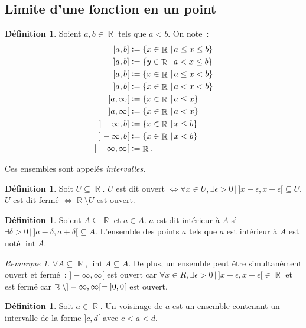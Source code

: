 \documentclass{article}
\DeclareMathOperator{\intr}{int}
\DeclareMathOperator{\R}{\mathbb R}
\theoremstyle{definition}
\newtheorem{déf}[thm]{Définition}
\theoremstyle{remark}
\newtheorem*{rmq}{Remarque}
\begin{document}
	\subsection{Limite d'une fonction en un point}
			\begin{déf} Soient $a, b \in \R$ tels que $a < b$. On note~:
				\[\begin{aligned}
					\interval {a}{b} &:= \{x \in \R \, | \, a \leq x \leq b\} \\
					]a, b] &:= \{y \in \R \, | \, a < x \leq b\} \\
					[a, b[ &:= \{x \in \R \, | \, a \leq x < b\} \\
					]a, b[ &:= \{x \in \R \, | \, a < x < b\} \\
					[a, \infty[ &:= \{x \in \R \, | \, a \leq x\} \\
					]a, \infty[ &:= \{x \in \R \, | \, a < x\} \\
					]-\infty, b] &:= \{x \in \R \, | \, x \leq b\} \\
					]-\infty, b[ &:= \{x \in \R \, | \, x < b\} \\
					]-\infty, \infty[ &:= \R.
				\end{aligned}\]

				Ces ensembles sont appelés \textit{intervalles}. \end{déf}

			\begin{déf} Soit $U \subseteq \R$. $U$ est dit ouvert $\iff \forall x \in U, \exists \epsilon > 0 \, | \, ]x-\epsilon, x+\epsilon[ \subseteq U$.
			$U$ est dit fermé $\iff \R \setminus U$ est ouvert. \end{déf}

			\begin{déf} Soient $A \subseteq \R$ et $a \in A$. $a$ est dit intérieur à $A$ s'$\exists \delta > 0 \, | \, ]a-\delta, a+\delta[ \subseteq A$.
			L'ensemble des points $a$ tels que $a$ est intérieur à $A$ est noté $\intr A$. \end{déf}

			\begin{rmq} $\forall A \subseteq \R$, $\intr A \subseteq A$. De plus, un ensemble peut être simultanément ouvert et fermé~: $]-\infty, \infty[$
			est ouvert car $\forall x \in R, \exists \epsilon > 0 \, | \, ]x-\epsilon, x+\epsilon[ \in \R$ et est fermé car
			$\R \setminus ]-\infty, \infty[ = \interval [open] 00$ est ouvert. \end{rmq}

			\begin{déf} Soit $a \in \R$. Un voisinage de $a$ est un ensemble contenant un intervalle de la forme $]c, d[$ avec $c < a < d$. \end{déf}
\end{document}
